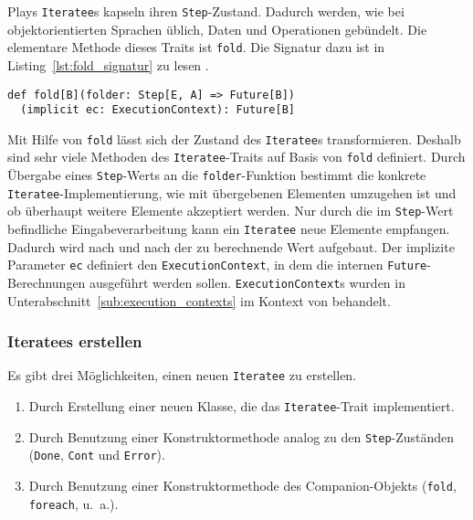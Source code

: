 Plays \lstinline|Iteratee|s kapseln ihren \lstinline|Step|-Zustand.
Dadurch werden, wie bei objektorientierten Sprachen üblich, Daten und Operationen gebündelt.
Die elementare Methode dieses Traits ist \lstinline|fold|.
Die Signatur dazu ist in Listing~\ref{lst:fold_signatur} zu lesen \cite[vgl.][Z.~400]{play_iteratee_source_code}.
\begin{lstlisting}[caption=Die Signatur von fold, label=lst:fold_signatur]
def fold[B](folder: Step[E, A] => Future[B])
  (implicit ec: ExecutionContext): Future[B]
\end{lstlisting}

Mit Hilfe von \lstinline|fold| lässt sich der Zustand des \lstinline|Iteratee|s transformieren.
Deshalb sind sehr viele Methoden des \lstinline|Iteratee|-Traits auf Basis von \lstinline|fold| definiert.
Durch Übergabe eines \lstinline|Step|-Werts an die \lstinline|folder|-Funktion bestimmt die konkrete \lstinline|Iteratee|-Implementierung, wie mit übergebenen Elementen umzugehen ist und ob überhaupt weitere Elemente akzeptiert werden.
Nur durch die im \lstinline|Step|-Wert befindliche Eingabeverarbeitung kann ein \lstinline|Iteratee| neue Elemente empfangen.
Dadurch wird nach und nach der zu berechnende Wert aufgebaut.
Der implizite Parameter \lstinline|ec| definiert den \lstinline|ExecutionContext|, in dem die internen \lstinline|Future|-Berechnungen ausgeführt werden sollen.
\lstinline|ExecutionContext|s wurden in Unterabschnitt~\ref{sub:execution_contexts} im Kontext von  behandelt.

\subsubsection{Iteratees erstellen} %
\label{ssub:iteratees_erstellen}

Es gibt drei Möglichkeiten, einen neuen \lstinline|Iteratee| zu erstellen.
\begin{enumerate}
  \item Durch Erstellung einer neuen Klasse, die das \lstinline|Iteratee|-Trait implementiert.
  \item Durch Benutzung einer Konstruktormethode analog zu den \lstinline|Step|-Zuständen (\lstinline|Done|, \lstinline|Cont| und \lstinline|Error|).
  \item Durch Benutzung einer Konstruktormethode des Companion-Objekts (\lstinline|fold|, \lstinline|foreach|, u.~a.).
\end{enumerate}

